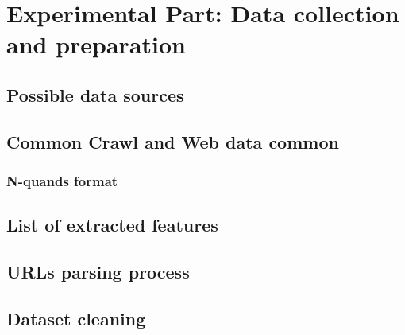 \chapter{Experimental Part: Data collection and preparation}
\label{chap:datacollect}
\section{Possible data sources}
\section{Common Crawl and Web data common}
\subsection{N-quands format}
\section{List of extracted features}
\section{URLs parsing process}
\section{Dataset cleaning}
